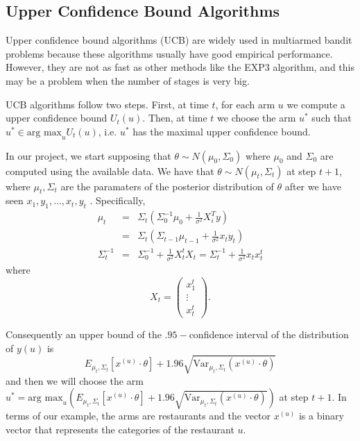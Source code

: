 \documentclass{article}
\theoremstyle{plain}
\theoremstyle{definition}
\begin{document}
\subsection{Upper Confidence Bound Algorithms}

Upper confidence bound algorithms (UCB) are widely used in multiarmed
bandit problems because these algorithms usually have good empirical performance. 
However, they are not as fast as other methods like the EXP3 algorithm, and this may be a problem
when the number of stages is very big.

UCB algorithms follow two steps. First, at time $t$, for each arm
$u$ we compute a upper confidence bound $U_{t}\left(u\right)$. Then,
at time $t$ we choose the arm $u^{*}$ such that $u^{*}\in\mbox{arg max}_{u}U_{t}\left(u\right)$,
i.e. $u^{*}$ has the maximal upper confidence bound. 

In our project, we start supposing that $\theta\sim N\left(\mu_{0},\Sigma_{0}\right)$
where $\mu_{0}$ and $\Sigma_{0}$ are computed using the available
data. We have that $\theta\sim N\left(\mu_{t},\Sigma_{t}\right)$
at step $t+1$, where $\mu_{t},\Sigma_{t}$ are the paramaters of
the posterior distribution of $\theta$ after we have seen $x_{1},y_{1},\ldots,x_{t},y_{t}$
. Specifically,
\begin{eqnarray*}
\mu_{t} & = & \Sigma_{t}\left(\Sigma_{0}^{-1}\mu_{0}+\frac{1}{\sigma^{2}}X_{i}^{T}y\right)\\
 & = & \Sigma_{t}\left(\Sigma_{t-1}\mu_{t-1}+\frac{1}{\sigma^{2}}x_{t}y_{t}\right)\\
\Sigma_{t}^{-1} & = & \Sigma_{0}^{-1}+\frac{1}{\sigma^{2}}X_{t}^{t}X_{t}=\Sigma_{t}^{-1}+\frac{1}{\sigma^{2}}x_{t}x_{t}^{t}
\end{eqnarray*}
where 
\[
X_{t}=\left(\begin{array}{c}
x_{1}^{t}\\
\vdots\\
x_{t}^{t}
\end{array}\right).
\]


Consequently an upper bound of the $.95-$confidence interval of the distribution
of $y\left(u\right)$ is 
\[
E_{\mu_{t},\Sigma_{t}}\left[x^{\left(u\right)}\cdot\theta\right]+1.96\sqrt{\mbox{Var}_{\mu_{t},\Sigma_{t}}\left(x^{\left(u\right)}\cdot\theta\right)}
\]
and then we will choose the arm $u^{*}=\mbox{arg max}_{u}\left(E_{\mu_{t},\Sigma_{t}}\left[x^{\left(u\right)}\cdot\theta\right]+1.96\sqrt{\mbox{Var}_{\mu_{t},\Sigma_{t}}\left(x^{\left(u\right)}\cdot\theta\right)}\right)$
at step $t+1$. In terms of our example, the arms are restaurants
and the vector $x^{\left(u\right)}$ is a binary vector that represents
the categories of the restaurant $u$.
\end{document}
